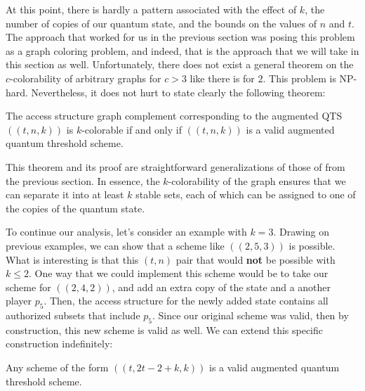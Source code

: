 At this point, there is hardly a pattern associated with the effect of $k$, the number of copies of our quantum state, and the bounds on the values of $n$ and $t$. The approach that worked for us in the previous section was posing this problem as a graph coloring problem, and indeed, that is the approach that we will take in this section as well. Unfortunately, there does not exist a general theorem on the $c$-colorability of arbitrary graphs for $c > 3$ like there is for $2$. This problem is NP-hard. Nevertheless, it does not hurt to state clearly the following theorem:

\begin{theorem}
    \label{thm:k-color-access}
    The access structure graph complement corresponding to the augmented QTS $((t,n,k))$ is $k$-colorable if and only if $((t,n,k))$ is a valid augmented quantum threshold scheme.
\end{theorem}

This theorem and its proof are straightforward generalizations of those of  from the previous section. In essence, the $k$-colorability of the graph ensures that we can separate it into at least $k$ stable sets, each of which can be assigned to one of the copies of the quantum state.

To continue our analysis, let's consider an example with $k=3$. Drawing on previous examples, we can show that a scheme like $((2,5,3))$ is possible. What is interesting is that this $(t,n)$ pair that would \textbf{not} be possible with $k \leq 2$. One way that we could implement this scheme would be to take our scheme for $((2,4,2))$, and add an extra copy of the state and a another player $p_5$. Then, the access structure for the newly added state contains all authorized subsets that include $p_5$. Since our original scheme was valid, then by construction, this new scheme is valid as well. We can extend this specific construction indefinitely:

\begin{theorem}
    \label{thm:build-scheme} 
    Any scheme of the form $((t,2t-2+k,k))$ is a valid augmented quantum threshold scheme.
\end{theorem}

